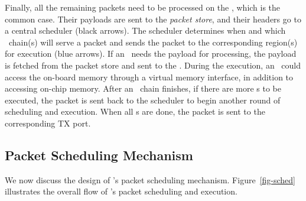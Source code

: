 Finally, all the remaining packets need to be processed on the \snic, which is the common case.
Their payloads are sent to the {\em packet store}, and their headers go to a central scheduler (black arrows). 
The scheduler determines when and which \nt\ chain(s) will serve a packet and sends the packet to the corresponding region(s) for execution (blue arrows).
If an \nt\ needs the payload for processing, the payload is fetched from the packet store and sent to the \nt.
During the execution, an \nt\ could access the on-board memory through a virtual memory interface, in addition to accessing on-chip memory.
After an \nt\ chain finishes, if there are more \nt{}s to be executed, the packet is sent back to the scheduler to begin another round of scheduling and execution.
When all \nt{}s are done, the packet is sent to the corresponding TX port.


\subsection{Packet Scheduling Mechanism}
\label{sec:snic:packetsched}

We now discuss the design of \snic's packet scheduling mechanism. Figure~\ref{fig-sched} illustrates the overall flow of \snic's packet scheduling and execution.


